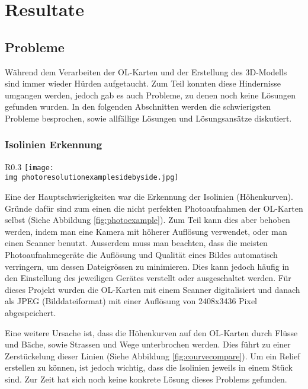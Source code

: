 \section{Resultate}

\subsection{Probleme}

Während dem Verarbeiten der OL-Karten und der Erstellung des 3D-Modells sind immer wieder Hürden aufgetaucht. Zum Teil konnten diese Hindernisse umgangen werden, jedoch gab es auch Probleme, zu denen noch keine Lösungen gefunden wurden. In den folgenden Abschnitten werden die schwierigsten Probleme besprochen, sowie allfällige Lösungen und Lösungsansätze diskutiert.

\subsubsection{Isolinien Erkennung}
\label{subsubsection:isolinien}

\begin{wrapfigure}[17]{R}{0.3\textwidth}
	\centering
	\texttt{[image: \\img photoresolutionexamplesidebyside.jpg]}
	\caption{Photoaufnahme Auflösung Vergleich, oben: 50x50, unten 200x200}
	\label{fig:photoexample}
\end{wrapfigure}

Eine der Hauptschwierigkeiten war die Erkennung der Isolinien (Höhenkurven). Gründe dafür sind zum einen die nicht perfekten Photoaufnahmen der OL-Karten selbst (Siehe Abbildung \ref{fig:photoexample}). Zum Teil kann dies aber behoben werden, indem man eine Kamera mit höherer Auflösung verwendet, oder man einen Scanner benutzt. Ausserdem muss man beachten, dass die meisten Photoaufnahmegeräte die Auflösung und Qualität eines Bildes automatisch verringern, um dessen Dateigrössen zu minimieren. Dies kann jedoch häufig in den Einstellung des jeweiligen Gerätes verstellt oder ausgeschaltet werden. Für dieses Projekt wurden die OL-Karten mit einem Scanner digitalisiert und danach als JPEG (Bilddateiformat) mit einer Auflösung von 2408x3436 Pixel abgespeichert. 



Eine weitere Ursache ist, dass die Höhenkurven auf den OL-Karten durch Flüsse und Bäche, sowie Strassen und Wege unterbrochen werden. Dies führt zu einer Zerstückelung dieser Linien (Siehe Abbildung \ref{fig:courvecompare}). Um ein Relief erstellen zu können, ist jedoch wichtig, dass die Isolinien jeweils in einem Stück sind. Zur Zeit hat sich noch keine konkrete Lösung dieses Problems gefunden. 

